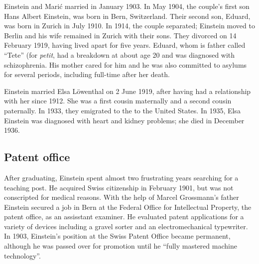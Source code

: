\documentclass[twoside]{article}
\begin{document}
Einstein and Mari\'{c} married in January 1903. In May 1904, the couple's
first son Hans Albert Einstein, was born in Bern, Switzerland. Their
second son, Eduard, was born in Zurich in July 1910. In 1914, the couple
separated; Einstein moved to Berlin and his wife remained in Zurich
with their sons. They divorced on 14 February 1919, having lived apart
for five years. Eduard, whom is father called ``Tete'' (for \emph{petit},
had a breakdown at about age 20 and was diagnosed with schizophrenia. His
mother cared for him and he was also committed to asylums for several
periods, including full-time after her death.

Einstein married Elsa L\"{o}wenthal on 2 June 1919, after having had
a relationship with her since 1912. She was a first cousin maternally
and a second cousin paternally. In 1933, they emigrated to the to the
United States. In 1935, Elsa Einstein was diagnosed with heart and 
kidney problems; she died in December 1936.

\subsection{Patent office}

After graduating, Einstein spent almost two frustrating years searching
for a teaching post. He acquired Swiss citizenship in February 1901,
but was not conscripted for medical reasons. With the help of Marcel
Grossmann's father Einstein secured a job in Bern at the Federal Office
for Intellectual Property, the patent office, as an assisstant examiner.
He evaluated patent applications for a variety of devices including
a gravel sorter and an electromechanical typewriter. In 1903, Einstein's
position at the Swiss Patent Office became permanent, although he
was passed over for promotion until he ``fully mastered machine
technology''.
\end{document}
